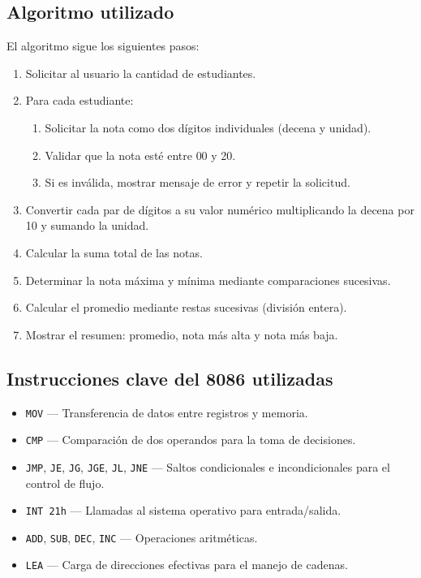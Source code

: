 \documentclass[12pt,a4paper]{article}
\begin{document}
\subsection{Algoritmo utilizado}

El algoritmo sigue los siguientes pasos:

\begin{enumerate}
    \item Solicitar al usuario la cantidad de estudiantes.
    \item Para cada estudiante:
    \begin{enumerate}
        \item Solicitar la nota como dos d\'igitos individuales (decena y unidad).
        \item Validar que la nota est\'e entre 00 y 20.
        \item Si es inv\'alida, mostrar mensaje de error y repetir la solicitud.
    \end{enumerate}
    \item Convertir cada par de d\'igitos a su valor num\'erico multiplicando la decena por 10 y sumando la unidad.
    \item Calcular la suma total de las notas.
    \item Determinar la nota m\'axima y m\'inima mediante comparaciones sucesivas.
    \item Calcular el promedio mediante restas sucesivas (divisi\'on entera).
    \item Mostrar el resumen: promedio, nota m\'as alta y nota m\'as baja.
\end{enumerate}

\subsection{Instrucciones clave del 8086 utilizadas}

\begin{itemize}
    \item \texttt{MOV} --- Transferencia de datos entre registros y memoria.
    \item \texttt{CMP} --- Comparaci\'on de dos operandos para la toma de decisiones.
    \item \texttt{JMP}, \texttt{JE}, \texttt{JG}, \texttt{JGE}, \texttt{JL}, \texttt{JNE} --- Saltos condicionales e incondicionales para el control de flujo.
    \item \texttt{INT 21h} --- Llamadas al sistema operativo para entrada/salida.
    \item \texttt{ADD}, \texttt{SUB}, \texttt{DEC}, \texttt{INC} --- Operaciones aritm\'eticas.
    \item \texttt{LEA} --- Carga de direcciones efectivas para el manejo de cadenas.
\end{itemize}
\end{document}
